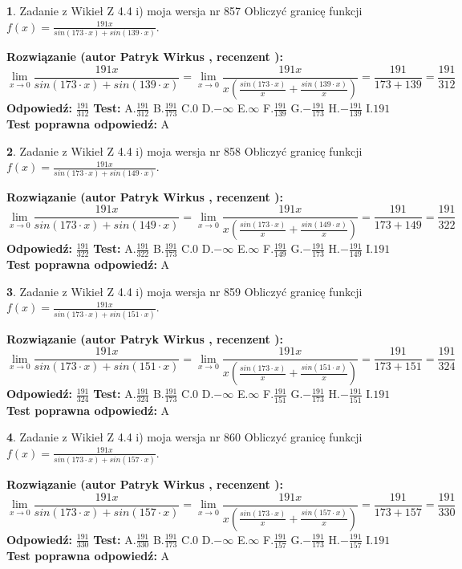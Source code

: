 \documentclass[12pt, a4paper]{article}
\theoremstyle{definition} %
\newtheorem{zad}{}
\newcommand{\zadStart}[1]{\begin{zad}#1\newline}
\newcommand{\zadStop}{\end{zad}}
\newcommand{\rozwStart}[2]{\noindent \textbf{Rozwiązanie (autor #1 , recenzent #2): }\newline}
\newcommand{\rozwStop}{\newline}
\newcommand{\odpStart}{\noindent \textbf{Odpowiedź:}\newline}
\newcommand{\odpStop}{\newline}
\newcommand{\testStart}{\noindent \textbf{Test:}\newline}
\newcommand{\testStop}{\newline}
\newcommand{\kluczStart}{\noindent \textbf{Test poprawna odpowiedź:}\newline}
\newcommand{\kluczStop}{\newline}
\begin{document}
\zadStart{Zadanie z Wikieł Z 4.4 i) moja wersja nr 857}
Obliczyć granicę funkcji $f(x)=\frac{191x}{sin(173\cdot x) +sin(139\cdot x)}$.
\zadStop
\rozwStart{Patryk Wirkus}{}
$$\lim\limits_{x\to 0}\frac{191x}{sin(173\cdot x) +sin(139\cdot x)}=\lim\limits_{x\to 0}\frac{191x}{x(\frac{sin(173\cdot x)}{x}+\frac{sin(139\cdot x)}{x})}=\frac{191}{173+139} = \frac{191}{312}$$
\rozwStop
\odpStart
$\frac{191}{312}$
\odpStop
\testStart
A.$\frac{191}{312}$
B.$\frac{191}{173}$
C.$0$
D.$-\infty$
E.$\infty$
F.$\frac{191}{139}$
G.$-\frac{191}{173}$
H.$-\frac{191}{139}$
I.$191$
\testStop
\kluczStart
A
\kluczStop



\zadStart{Zadanie z Wikieł Z 4.4 i) moja wersja nr 858}
Obliczyć granicę funkcji $f(x)=\frac{191x}{sin(173\cdot x) +sin(149\cdot x)}$.
\zadStop
\rozwStart{Patryk Wirkus}{}
$$\lim\limits_{x\to 0}\frac{191x}{sin(173\cdot x) +sin(149\cdot x)}=\lim\limits_{x\to 0}\frac{191x}{x(\frac{sin(173\cdot x)}{x}+\frac{sin(149\cdot x)}{x})}=\frac{191}{173+149} = \frac{191}{322}$$
\rozwStop
\odpStart
$\frac{191}{322}$
\odpStop
\testStart
A.$\frac{191}{322}$
B.$\frac{191}{173}$
C.$0$
D.$-\infty$
E.$\infty$
F.$\frac{191}{149}$
G.$-\frac{191}{173}$
H.$-\frac{191}{149}$
I.$191$
\testStop
\kluczStart
A
\kluczStop



\zadStart{Zadanie z Wikieł Z 4.4 i) moja wersja nr 859}
Obliczyć granicę funkcji $f(x)=\frac{191x}{sin(173\cdot x) +sin(151\cdot x)}$.
\zadStop
\rozwStart{Patryk Wirkus}{}
$$\lim\limits_{x\to 0}\frac{191x}{sin(173\cdot x) +sin(151\cdot x)}=\lim\limits_{x\to 0}\frac{191x}{x(\frac{sin(173\cdot x)}{x}+\frac{sin(151\cdot x)}{x})}=\frac{191}{173+151} = \frac{191}{324}$$
\rozwStop
\odpStart
$\frac{191}{324}$
\odpStop
\testStart
A.$\frac{191}{324}$
B.$\frac{191}{173}$
C.$0$
D.$-\infty$
E.$\infty$
F.$\frac{191}{151}$
G.$-\frac{191}{173}$
H.$-\frac{191}{151}$
I.$191$
\testStop
\kluczStart
A
\kluczStop



\zadStart{Zadanie z Wikieł Z 4.4 i) moja wersja nr 860}
Obliczyć granicę funkcji $f(x)=\frac{191x}{sin(173\cdot x) +sin(157\cdot x)}$.
\zadStop
\rozwStart{Patryk Wirkus}{}
$$\lim\limits_{x\to 0}\frac{191x}{sin(173\cdot x) +sin(157\cdot x)}=\lim\limits_{x\to 0}\frac{191x}{x(\frac{sin(173\cdot x)}{x}+\frac{sin(157\cdot x)}{x})}=\frac{191}{173+157} = \frac{191}{330}$$
\rozwStop
\odpStart
$\frac{191}{330}$
\odpStop
\testStart
A.$\frac{191}{330}$
B.$\frac{191}{173}$
C.$0$
D.$-\infty$
E.$\infty$
F.$\frac{191}{157}$
G.$-\frac{191}{173}$
H.$-\frac{191}{157}$
I.$191$
\testStop
\kluczStart
A
\kluczStop
\end{document}
